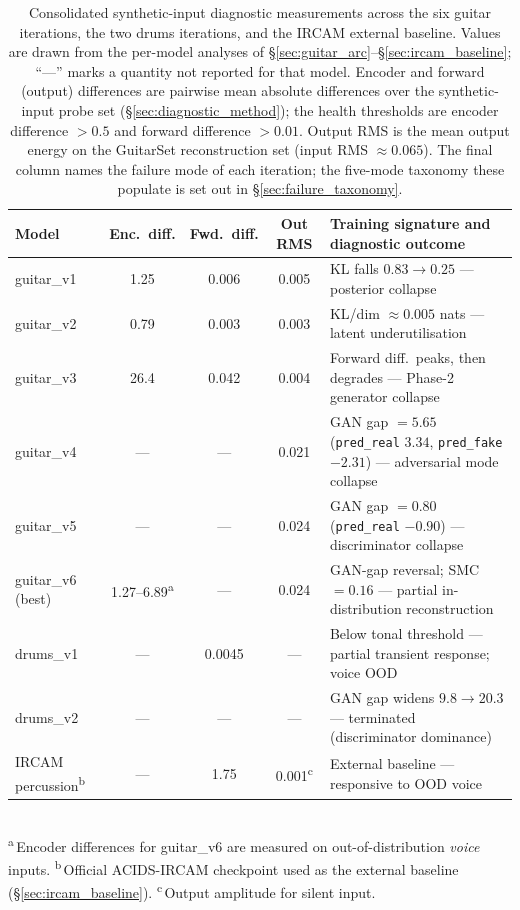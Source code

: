 \documentclass[a4paper,11pt,oneside,openany]{book}
\begin{document}
\begin{table}[H]
\centering
\caption{Consolidated synthetic-input diagnostic measurements across the six guitar iterations, the two drums iterations, and the IRCAM external baseline. Values are drawn from the per-model analyses of \S\ref{sec:guitar_arc}--\S\ref{sec:ircam_baseline}; ``---'' marks a quantity not reported for that model. Encoder and forward (output) differences are pairwise mean absolute differences over the synthetic-input probe set (\S\ref{sec:diagnostic_method}); the health thresholds are encoder difference $>0.5$ and forward difference $>0.01$. Output RMS is the mean output energy on the GuitarSet reconstruction set (input RMS $\approx 0.065$). The final column names the failure mode of each iteration; the five-mode taxonomy these populate is set out in \S\ref{sec:failure_taxonomy}.}
\label{tab:diagnostics}
\footnotesize
\setlength{\tabcolsep}{4pt}
\renewcommand{\arraystretch}{1.2}
\begin{tabularx}{\textwidth}{@{}>{\raggedright\arraybackslash}p{2.5cm}ccc>{\raggedright\arraybackslash}X@{}}
\toprule
\textbf{Model} & \textbf{Enc.\ diff.} & \textbf{Fwd.\ diff.} & \textbf{Out RMS} & \textbf{Training signature and diagnostic outcome} \\
\midrule
guitar\_v1 & 1.25 & 0.006 & 0.005 & KL falls $0.83\!\to\!0.25$ --- posterior collapse \\
guitar\_v2 & 0.79 & 0.003 & 0.003 & KL/dim $\approx 0.005$ nats --- latent underutilisation \\
guitar\_v3 & 26.4 & 0.042 & 0.004 & Forward diff.\ peaks, then degrades --- Phase-2 generator collapse \\
guitar\_v4 & --- & --- & 0.021 & GAN gap $=5.65$ (\texttt{pred\_real} $3.34$, \texttt{pred\_fake} $-2.31$) --- adversarial mode collapse \\
guitar\_v5 & --- & --- & 0.024 & GAN gap $=0.80$ (\texttt{pred\_real} $-0.90$) --- discriminator collapse \\
guitar\_v6 (best) & 1.27--6.89\textsuperscript{a} & --- & 0.024 & GAN-gap reversal; SMC $=0.16$ --- partial in-distribution reconstruction \\
drums\_v1 & --- & 0.0045 & --- & Below tonal threshold --- partial transient response; voice OOD \\
drums\_v2 & --- & --- & --- & GAN gap widens $9.8\!\to\!20.3$ --- terminated (discriminator dominance) \\
IRCAM percussion\textsuperscript{b} & --- & 1.75 & 0.001\textsuperscript{c} & External baseline --- responsive to OOD voice \\
\bottomrule
\end{tabularx}\\[3pt]
{\footnotesize \textsuperscript{a}\,Encoder differences for guitar\_v6 are measured on out-of-distribution \emph{voice} inputs. \quad\textsuperscript{b}\,Official ACIDS-IRCAM checkpoint used as the external baseline (\S\ref{sec:ircam_baseline}). \quad\textsuperscript{c}\,Output amplitude for silent input.}
\end{table}
\end{document}
